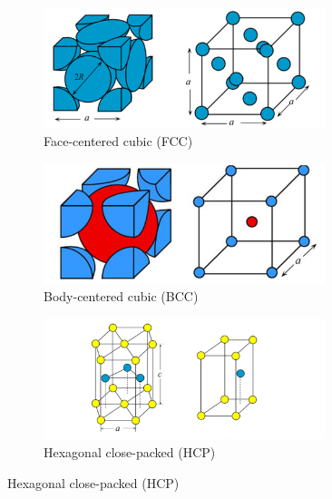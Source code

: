 \begin{figure}[ht!]
    \centering
    \begin{subfigure}[t]{0.32\linewidth}
        \centering
        \includegraphics[width=0.9\textwidth]{images/fcc.png}
        \caption{Face-centered cubic (FCC)}
    \end{subfigure}
    \begin{subfigure}[t]{0.32\linewidth}
        \centering
        \includegraphics[width=0.9\textwidth]{images/bcc.png}
        \caption{Body-centered cubic (BCC)}
    \end{subfigure}
    \begin{subfigure}[t]{0.32\linewidth}
        \centering
        \includegraphics[width=0.9\textwidth]{images/hcp.png}
        \caption{Hexagonal close-packed (HCP)}
    \end{subfigure} 
    

\end{figure}
